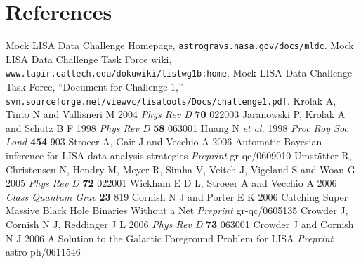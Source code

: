 \documentclass[12pt]{iopart}
\begin{document}
\section*{References}
\begin{thebibliography}{10}
 Mock LISA Data Challenge Homepage, {\tt astrogravs.nasa.gov/docs/mldc}.
 Mock LISA Data Challenge Task Force wiki, {\tt www.tapir.caltech.edu/dokuwiki/listwg1b:home}.
 Mock LISA Data Challenge Task Force, ``Document for Challenge 1,'' {\tt svn.sourceforge.net/viewvc/lisatools/Docs/challenge1.pdf}.
 Krolak A, Tinto N and Vallisneri M 2004 {\it Phys Rev D} {\bf 70} 022003
 Jaranowski P, Krolak A and Schutz B F 1998 {\it Phys Rev D} {\bf 58} 063001
 Huang N {\it et al.} 1998 {\it Proc Roy Soc Lond} {\bf 454} 903
 Stroeer A, Gair J and Vecchio A 2006 Automatic Bayesian inference for LISA data analysis strategies {\it Preprint} gr-qc/0609010
 Umst\"{a}tter R, Christensen N, Hendry M, Meyer R, Simha V, Veitch J, Vigeland S and Woan G 2005 {\it Phys Rev D} {\bf 72} 022001
 Wickham E D L, Stroeer A and Vecchio A 2006 {\it Class Quantum Grav} {\bf 23} 819
 Cornish N J and Porter E K 2006 Catching Super Massive Black Hole Binaries Without a Net {\it Preprint} gr-qc/0605135
 Crowder J, Cornish N J, Reddinger J L 2006 {\it Phys Rev D} {\bf 73} 063001
 Crowder J and Cornish N J 2006 A Solution to the Galactic Foreground Problem for LISA {\it Preprint} astro-ph/0611546

\end{thebibliography}
\end{document}
